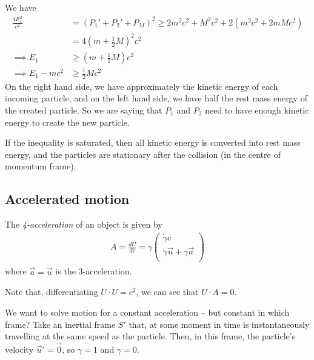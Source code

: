 \documentclass{../../template/note}
\begin{document}
    We have
    \begin{align*}
        \frac{4E_1^2}{c^2} &= (P_1'+P_2'+P_M)^2 \geq 2m^2c^2 + M^2c^2 + 2(m^2c^2 + 2mMc^2) \\
        &= 4\left(m + \frac 1 2 M\right)^2c^2 \\
        \implies E_1 &\geq \left(m + \frac 1 2 M\right)c^2 \\
        \implies E_1 - mc^2 &\geq \frac 1 2 Mc^2
    \end{align*}
    On the right hand side, we have approximately the kinetic energy of each incoming particle, and on the left hand side, we have half the rest mass energy of the created particle. So we are saying that $P_1$ and $P_2$ need to have enough kinetic energy to create the new particle.
    
    If the inequality is saturated, then all kinetic energy is converted into rest mass energy, and the particles are stationary after the collision (in the centre of momentum frame).

    \subsection{Accelerated motion}

    \begin{definition}[4-acceleration]
        The \emph{4-acceleration} of an object is given by
        \begin{align*}
            A = \frac{dU}{d\tau} = \gamma \begin{pmatrix}
                \dot \gamma c \\
                \dot \gamma \vec u + \gamma \vec a \\
            \end{pmatrix}
        \end{align*}
        where $\vec a = \dot{\vec u}$ is the 3-acceleration.
    \end{definition}

    \begin{remark*}
        Note that, differentiating $U \cdot U = c^2$, we can see that $U \cdot A = 0$.
    \end{remark*}

    We want to solve motion for a constant acceleration -- but constant in which frame? Take an inertial frame $S'$ that, at some moment in time is instantaneously travelling at the same speed as the particle. Then, in this frame, the particle's velocity $\vec u' = \vec 0$, so $\gamma = 1$ and $\dot \gamma = 0$.
\end{document}
